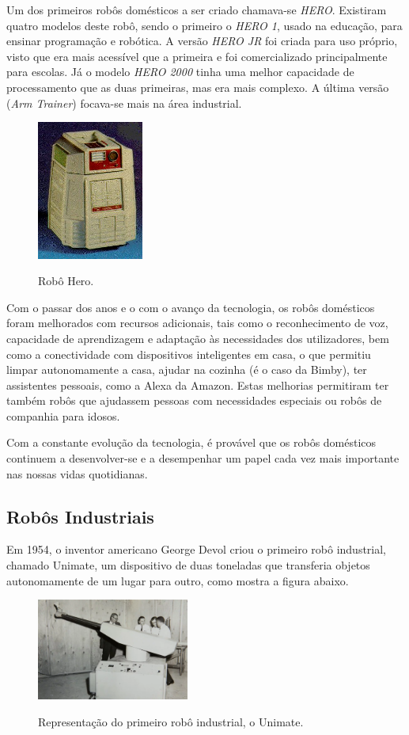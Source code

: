 \documentclass[10pt]{article}
\begin{document}
Um dos primeiros robôs domésticos a ser criado chamava-se \textit{HERO}. Existiram quatro modelos deste robô, sendo o primeiro o \textit{HERO 1}, usado na educação, para ensinar programação e robótica. A versão \textit{HERO JR} foi criada para uso próprio, visto que era mais acessível que a primeira e foi comercializado principalmente para escolas. Já o modelo \textit{HERO 2000} tinha uma melhor capacidade de processamento que as duas primeiras, mas era mais complexo. A última versão (\textit{Arm Trainer}) focava-se mais na área industrial.

\begin{figure}[h]
\centering
\includegraphics[width = 3.5cm]{img/hero.jpg} 
\label{figura:1}
\caption{Robô Hero.}
\end{figure}

Com o passar dos anos e o com o avanço da tecnologia, os robôs domésticos foram melhorados com recursos adicionais, tais como o reconhecimento de voz, capacidade de aprendizagem e adaptação às necessidades dos utilizadores, bem como a conectividade com dispositivos inteligentes em casa, o que permitiu limpar autonomamente a casa, ajudar na cozinha (é o caso da Bimby), ter assistentes pessoais, como a Alexa da Amazon. Estas melhorias permitiram ter também robôs que ajudassem pessoas com necessidades especiais ou robôs de companhia para idosos.

Com a constante evolução da tecnologia, é provável que os robôs domésticos continuem a desenvolver-se e a desempenhar um papel cada vez mais importante nas nossas vidas quotidianas.

\subsection{Robôs Industriais}
\hspace{\parindent}Em 1954, o inventor americano George Devol criou o primeiro robô industrial, chamado Unimate, um dispositivo de duas toneladas que transferia objetos autonomamente de um lugar para outro, como mostra a figura abaixo\cite{wevolver}.
\\
\begin{figure}[h]
\centering
\includegraphics[width = 5cm]{img/robind.png}
\label{figura:2}
\caption{Representação do primeiro robô industrial, o Unimate.}
\end{figure}
\\
\end{document}
